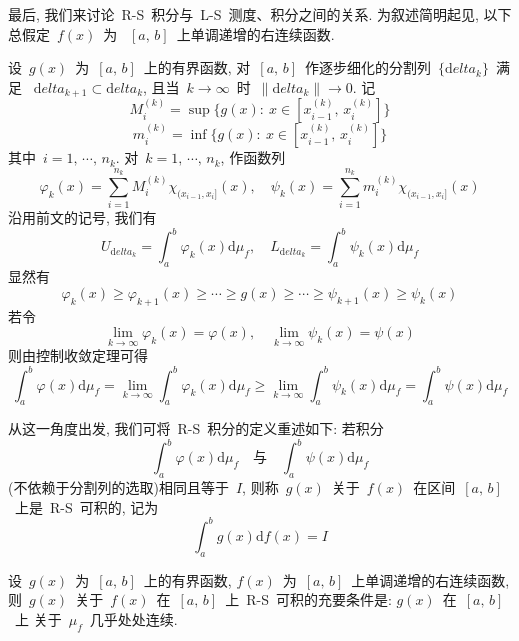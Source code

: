 最后, 我们来讨论~R-S~积分与~L-S~测度、积分之间的关系. 为叙述简明起见, 以下总假定~$f(x)$~为
~$[a,\,b]$~上单调递增的右连续函数.

设~$g(x)$~为~$[a,\,b]$~上的有界函数, 对~$[a,\,b]$~作逐步细化的分割列~$\{\mathrm{d}elta_k\}$~满足
~$\mathrm{d}elta_{k+1} \subset \mathrm{d}elta_k$, 且当~$k \to \infty$~时~$\|\mathrm{d}elta_k\| \to 0$. 记
\[
M_i^{(k)} = \sup \big\{ g(x): \: x \in [x_{i-1}^{(k)},\,x_i^{(k)}]  \big\}
\]
\[
m_i^{(k)} = \inf \big\{ g(x): \: x \in [x_{i-1}^{(k)},\,x_i^{(k)}]  \big\}
\]
其中~$i=1,\,\cdots,\,n_k$. 对~$k=1,\,\cdots,\,n_k$, 作函数列
\[
\varphi_k(x)=\sum_{i=1}^{n_k} M_i^{(k)} \chi_{(x_{i-1},x_i]}(x), \quad
\psi_k(x)=\sum_{i=1}^{n_k} m_i^{(k)} \chi_{(x_{i-1},x_i]}(x)
\]
沿用前文的记号, 我们有
\[
U_{\mathrm{d}elta_k} = \int_a^b \varphi_k(x) \mathrm{d} \mu_f, \quad L_{\mathrm{d}elta_k} = \int_a^b \psi_k(x) \mathrm{d} \mu_f
\]
显然有
\[
\varphi_k(x) \geqslant \varphi_{k+1}(x) \geqslant \cdots \geqslant g(x) \geqslant \cdots \geqslant \psi_{k+1}(x) \geqslant \psi_k(x)
\]
若令
\[
\lim_{k \to \infty} \varphi_k(x) = \varphi(x), \quad \lim_{k \to \infty} \psi_k(x) = \psi(x)
\]
则由控制收敛定理可得
\[
\int_a^b \varphi(x) \mathrm{d} \mu_f = \lim_{k \to \infty} \int_a^b \varphi_k(x) \mathrm{d} \mu_f \geqslant \lim_{k \to \infty} \int_a^b \psi_k(x) \mathrm{d} \mu_f = \int_a^b \psi(x) \mathrm{d} \mu_f
\]

从这一角度出发, 我们可将~R-S~积分的定义重述如下: 若积分
\[
\int_a^b \varphi(x) \mathrm{d} \mu_f \quad \mbox{与} \quad \int_a^b \psi(x) \mathrm{d} \mu_f
\]
(不依赖于分割列的选取)相同且等于~$I$, 则称~$g(x)$~关于~$f(x)$~在区间~$[a,\,b]$~上是~R-S~可积的, 记为
\[
\int_a^b g(x) \mathrm{d} f(x) = I
\]

\begin{Theorem}
设~$g(x)$~为~$[a,\,b]$~上的有界函数, $f(x)$~为~$[a,\,b]$~上单调递增的右连续函数, 则~$g(x)$~关于~$f(x)$~在~$[a,\,b]$~上~R-S~可积的充要条件是: $g(x)$~在~$[a,\,b]$~上
关于~$\mu_f$~几乎处处连续.
\end{Theorem}

